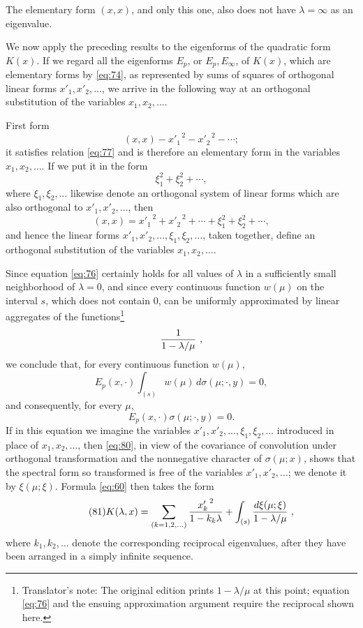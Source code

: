 \documentclass[b5paper,twoside]{article}
\newcommand{\originalpage}[1]{\phantomsection\label{origpage:#1}}
\begin{document}
The elementary form $(x,x)$, and only this one, also does not have
$\lambda=\infty$ as an eigenvalue.

We now apply the preceding results to the eigenforms of the quadratic form
$K(x)$.  If we regard all the eigenforms $E_p$, or $E_p,E_\infty$, of $K(x)$,
which are elementary forms by \eqref{eq:74}, as represented by sums of
squares of orthogonal linear\originalpage{196} forms
$x'_1,x'_2,\ldots$, we arrive in the following way at an orthogonal
substitution of the variables $x_1,x_2,\ldots$.

First form
\[
  (x,x)-{x'_1}^{\,2}-{x'_2}^{\,2}-\cdots;
\]
it satisfies relation \eqref{eq:77} and is therefore an elementary form in
the variables $x_1,x_2,\ldots$.  If we put it in the form
\[
  \xi_1^2+\xi_2^2+\cdots,
\]
where $\xi_1,\xi_2,\ldots$ likewise denote an orthogonal system of linear
forms which are also orthogonal to $x'_1,x'_2,\ldots$, then
\[
  (x,x)={x'_1}^{\,2}+{x'_2}^{\,2}+\cdots+\xi_1^2+\xi_2^2+\cdots,
\]
and hence the linear forms $x'_1,x'_2,\ldots,\xi_1,\xi_2,\ldots$, taken
together, define an orthogonal substitution of the variables
$x_1,x_2,\ldots$.

Since equation \eqref{eq:76} certainly holds for all values of $\lambda$ in
a sufficiently small neighborhood of $\lambda=0$, and since every continuous
function $w(\mu)$ on the interval $s$, which does not contain $0$, can be
uniformly approximated by linear aggregates of the functions\footnote{Translator's
note: The original edition prints $1-\lambda/\mu$ at this point; equation
\eqref{eq:76} and the ensuing approximation argument require the reciprocal
shown here.}
\[
  \frac{1}{1-\lambda/\mu}\mkern6mu,
\]
we conclude that, for every continuous function $w(\mu)$,
\[
  E_p(x,\mathord{\cdot})
  \int_{(s)}w(\mu)\,d\sigma(\mu;\mathord{\cdot},y)=0,
\]
and consequently, for every $\mu$,
\begin{equation}
\tag{80}\label{eq:80}
  E_p(x,\mathord{\cdot})\sigma(\mu;\mathord{\cdot},y)=0.
\end{equation}
If in this equation we imagine the variables
$x'_1,x'_2,\ldots,\xi_1,\xi_2,\ldots$ introduced in place of
$x_1,x_2,\ldots$, then \eqref{eq:80}, in view of the covariance of
convolution under orthogonal transformation and the nonnegative character of
$\sigma(\mu;x)$, shows that the spectral form so transformed is free of the
variables $x'_1,x'_2,\ldots$; we denote it by $\xi(\mu;\xi)$.  Formula
\eqref{eq:60} then takes the form
\begin{equation}
\tag{81}\label{eq:81}
  K(\lambda,x)
  =\sum_{(k=1,2,\ldots)}\frac{{x'_k}^{\,2}}{1-k_k\lambda}
   +\int_{(s)}\frac{d\xi(\mu;\xi)}{1-\lambda/\mu}\mkern6mu,
\end{equation}
where $k_1,k_2,\ldots$ denote the corresponding reciprocal eigenvalues,
after they have been arranged in a simply infinite sequence.
\end{document}
